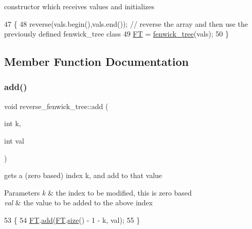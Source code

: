constructor which receives values and initializes 


\begin{DoxyCode}
47 \{
48   reverse(vals.begin(),vals.end()); \textcolor{comment}{// reverse the array and then use the previously defined fenwick\_tree
       class}
49   \hyperlink{classreverse__fenwick__tree_acde105967b3a3befc31e743807f7fd86}{FT} = \hyperlink{classfenwick__tree}{fenwick\_tree}(vals);
50 \}
\end{DoxyCode}


\subsection{Member Function Documentation}
\mbox{\label{classreverse__fenwick__tree_a942d7f49b37e53ebfec3076d177691d7}} 
\subsubsection{\texorpdfstring{add()}{add()}}
{\footnotesize\ttfamily void reverse\+\_\+fenwick\+\_\+tree\+::add (\begin{DoxyParamCaption}\item[{int}]{k,  }\item[{int}]{val }\end{DoxyParamCaption})}

gets a (zero based) index k, and add to that value 
\begin{DoxyParams}{Parameters}
{\em k} & the index to be modified, this is zero based \\
\hline
{\em val} & the value to be added to the above index \\
\hline
\end{DoxyParams}

\begin{DoxyCode}
53 \{
54   \hyperlink{classreverse__fenwick__tree_acde105967b3a3befc31e743807f7fd86}{FT}.\hyperlink{classfenwick__tree_ab2f999bba718bcd57d066db754d85ad4}{add}(\hyperlink{classreverse__fenwick__tree_acde105967b3a3befc31e743807f7fd86}{FT}.\hyperlink{classfenwick__tree_abedd21a2ddbbb830195c8eba1330112f}{size}() - 1 - k, val);
55 \}
\end{DoxyCode}
\mbox{\label{classreverse__fenwick__tree_ae15a8ac2ee6049baadcd110a98ae96e8}} 
